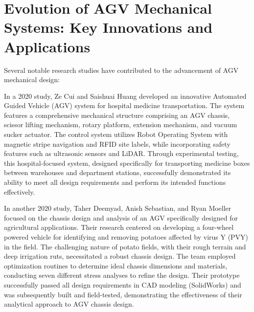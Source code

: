 \documentclass[../../main]{subfiles}
\begin{document}
\section{Evolution of AGV Mechanical Systems: Key Innovations and Applications}



Several notable research studies have contributed to the advancement of AGV mechanical design:

In a 2020 study, Ze Cui and Saishuai Huang developed an innovative Automated Guided Vehicle (AGV) system for hospital medicine transportation. The system features a comprehensive mechanical structure comprising an AGV chassis, scissor lifting mechanism, rotary platform, extension mechanism, and vacuum sucker actuator. The control system utilizes Robot Operating System with magnetic stripe navigation and RFID site labels, while incorporating safety features such as ultrasonic sensors and LiDAR. Through experimental testing, this hospital-focused system, designed specifically for transporting medicine boxes between warehouses and department stations, successfully demonstrated its ability to meet all design requirements and perform its intended functions effectively.

In another 2020 study, Taher Deemyad, Anish Sebastian, and Ryan Moeller focused on the chassis design and analysis of an AGV specifically designed for agricultural applications. Their research centered on developing a four-wheel powered vehicle for identifying and removing potatoes affected by virus Y (PVY) in the field. The challenging nature of potato fields, with their rough terrain and deep irrigation ruts, necessitated a robust chassis design. The team employed optimization routines to determine ideal chassis dimensions and materials, conducting seven different stress analyses to refine the design. Their prototype successfully passed all design requirements in CAD modeling (SolidWorks) and was subsequently built and field-tested, demonstrating the effectiveness of their analytical approach to AGV chassis design.
\end{document}
